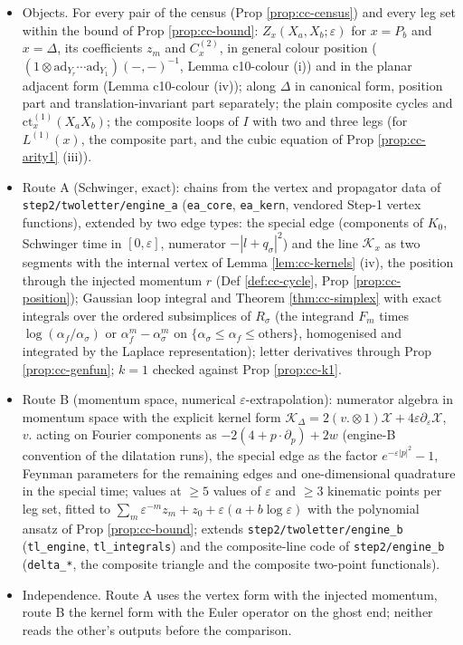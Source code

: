 \documentclass[11pt]{article}
\numberwithin{equation}{section}
\theoremstyle{plain}
\theoremstyle{definition}
\begin{document}
\begin{itemize}
\item Objects. For every pair of the census (Prop \ref{prop:cc-census}) and every leg set within the bound of Prop \ref{prop:cc-bound}: $Z_x(X_a,X_b;\varepsilon)$ for $x=P_b$ and $x=\Delta$, its coefficients $z_m$ and $C^{(2)}_x$, in general colour position ($(1\otimes\mathrm{ad}_{Y_r}\cdots\mathrm{ad}_{Y_1})(-,-)^{-1}$, Lemma c10-colour (i)) and in the planar adjacent form (Lemma c10-colour (iv)); along $\Delta$ in canonical form, position part and translation-invariant part separately; the plain composite cycles and $\mathrm{ct}^{(1)}_x(X_aX_b)$; the composite loops of $I$ with two and three legs (for $L^{(1)}(x)$, the composite part, and the cubic equation of Prop \ref{prop:cc-arity1} (iii)).
\item \sloppy Route A (Schwinger, exact): chains from the vertex and propagator data of \texttt{step2/twoletter/engine\_a} (\texttt{ea\_core}, \texttt{ea\_kern}, vendored Step-1 vertex functions), extended by two edge types: the special edge (components of $K_0$, Schwinger time in $[0,\varepsilon]$, numerator $-|l+q_\sigma|^2$) and the line $\mathcal K_x$ as two segments with the internal vertex of Lemma \ref{lem:cc-kernels} (iv), the position through the injected momentum $r$ (Def \ref{def:cc-cycle}, Prop \ref{prop:cc-position}); Gaussian loop integral and Theorem \ref{thm:cc-simplex} with exact integrals over the ordered subsimplices of $R_\sigma$ (the integrand $F_m$ times $\log(\alpha_f/\alpha_\sigma)$ or $\alpha_f^m-\alpha_\sigma^m$ on $\{\alpha_\sigma\le\alpha_f\le\text{others}\}$, homogenised and integrated by the Laplace representation); letter derivatives through Prop \ref{prop:cc-genfun}; $k=1$ checked against Prop \ref{prop:cc-k1}.
\item Route B (momentum space, numerical $\varepsilon$-extrapolation): numerator algebra in momentum space with the explicit kernel form $\mathcal K_\Delta=2(v.\otimes1)\mathcal X+4\varepsilon\partial_\varepsilon\mathcal X$, $v.$ acting on Fourier components as $-2(4+p\cdot\partial_p)+2w$ (engine-B convention of the dilatation runs), the special edge as the factor $e^{-\varepsilon|p|^2}-1$, Feynman parameters for the remaining edges and one-dimensional quadrature in the special time; values at $\geq5$ values of $\varepsilon$ and $\geq3$ kinematic points per leg set, fitted to $\sum_m\varepsilon^{-m}z_m+z_0+\varepsilon(a+b\log\varepsilon)$ with the polynomial ansatz of Prop \ref{prop:cc-bound}; extends \texttt{step2/twoletter/engine\_b} (\texttt{tl\_engine}, \texttt{tl\_integrals}) and the composite-line code of \texttt{step2/engine\_b} (\texttt{delta\_*}, the composite triangle and the composite two-point functionals).
\item Independence. Route A uses the vertex form with the injected momentum, route B the kernel form with the Euler operator on the ghost end; neither reads the other's outputs before the comparison.
\end{itemize}
\end{document}
